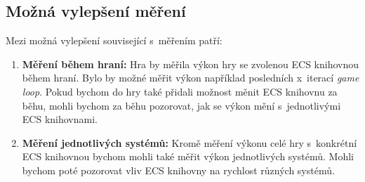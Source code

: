 \subsection{Možná vylepšení měření}
Mezi možná vylepšení související s~měřením patří:

\begin{enumerate}
    \item \textbf{Měření během hraní:} Hra by měřila výkon hry se zvolenou ECS knihovnou během hraní. Bylo by možné měřit výkon například posledních x~iterací \textit{game loop}. Pokud bychom do hry také přidali možnost měnit ECS knihovnu za běhu, mohli bychom za běhu pozorovat, jak se výkon mění s~jednotlivými ECS knihovnami.
    
    \item \textbf{Měření jednotlivých systémů:} Kromě měření výkonu celé hry s~konkrétní ECS knihovnou bychom mohli také měřit výkon jednotlivých systémů. Mohli bychom poté pozorovat vliv ECS knihovny na rychlost různých systémů. 
\end{enumerate}










